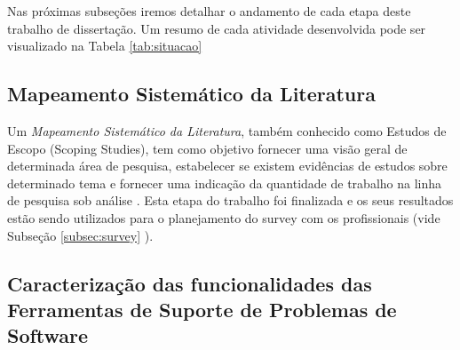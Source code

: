 \documentclass[10pt,a4paper]{report}
\begin{document}
Nas próximas subseções iremos detalhar o andamento de cada etapa deste trabalho de dissertação. Um resumo de cada atividade desenvolvida pode ser visualizado na Tabela \ref{tab:situacao}

\begin{table}[ht]
	\centering
	\caption{Situação das Atividades da Dissertação}
	\label{tab:situacao}
\end{table}


\subsection{Mapeamento Sistemático da Literatura}
\label{subsec:revisao_sistematica}

Um \textit{Mapeamento Sistemático da Literatura}, também conhecido como Estudos de Escopo (Scoping Studies), tem como objetivo fornecer uma visão geral de determinada área de pesquisa, estabelecer se existem evidências de estudos sobre determinado tema e fornecer uma indicação da quantidade de trabalho na linha de pesquisa sob análise \cite{keele2007guidelines,wohlin2012experimentation}. Esta etapa do trabalho foi finalizada e os  seus resultados estão sendo utilizados para o planejamento do survey com os profissionais (vide Subseção \ref{subsec:survey} ).

\subsection{Caracterização das funcionalidades das Ferramentas de Suporte de Problemas de Software }
\label{subsec:caracterizacao}
\end{document}
